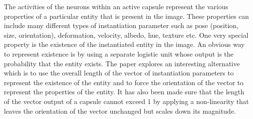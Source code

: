 \documentclass[10pt,twocolumn,letterpaper]{article}
\begin{document}
The activities of the neurons within an active capsule represent the various properties of a particular entity that is present in the image. These properties can include many different types of instantiation parameter such as pose (position, size, orientation), deformation, velocity, albedo, hue, texture etc. One very special property is the existence of the instantiated entity in the image. An obvious way to represent existence is by using a separate logistic unit whose output is the probability that the entity exists. The paper explores an interesting alternative which is to use the overall length of the vector of instantiation parameters to represent the existence of the entity and to force the orientation of the vector to represent the properties of the entity. It has also been made sure that the length of the vector output of a capsule cannot exceed 1 by applying a non-linearity that leaves the orientation of the vector unchanged but scales down its magnitude.
\\
\end{document}
